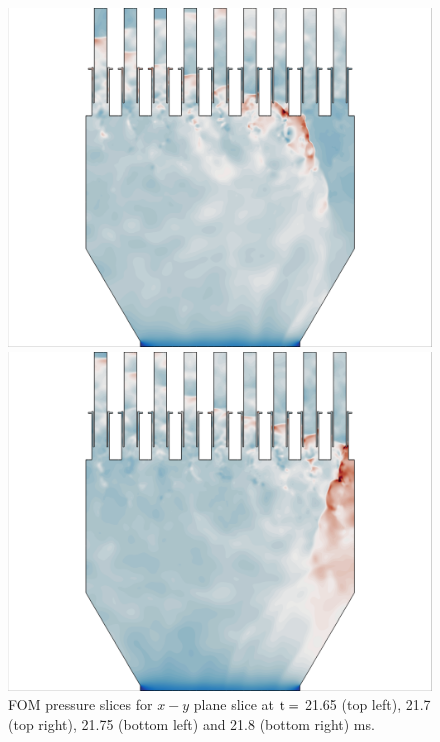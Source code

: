 \begin{figure}
	\begin{minipage}{0.49\linewidth}
		\includegraphics[width=0.99\linewidth,trim={0.5em 0em 6cm 0em},clip]{Chapters/HPROMResults/Images/nineElem/example_snaps/example_pressure_z_217500.png}
	\end{minipage}
	\begin{minipage}{0.49\linewidth}
		\includegraphics[width=0.99\linewidth,trim={6cm 0em 0.5em 0em},clip]{Chapters/HPROMResults/Images/nineElem/example_snaps/example_pressure_z_218000.png}
	\end{minipage}
	\caption{\label{fig:nineElemFOMPressure}FOM pressure slices for $x-y$ plane slice at $\text{t} = $ 21.65 (top left), 21.7 (top right), 21.75 (bottom left) and 21.8 (bottom right) ms.}
\end{figure}

